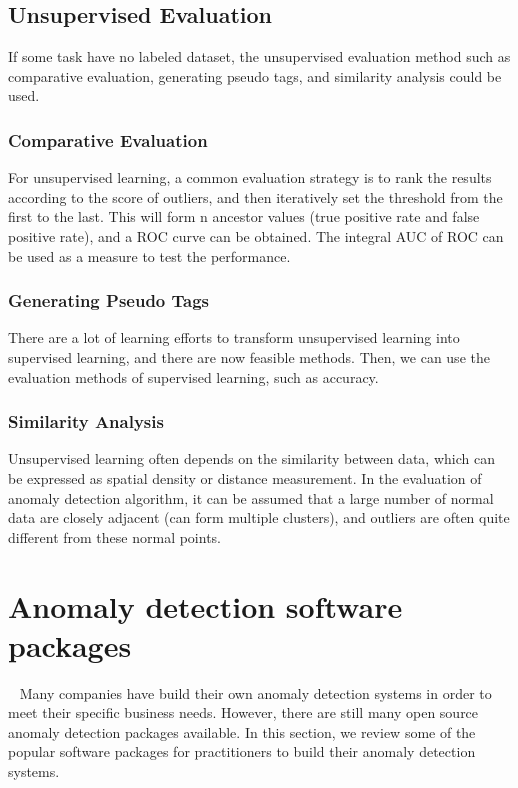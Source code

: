 \subsection{Unsupervised Evaluation}
If some task have no labeled dataset,
the unsupervised evaluation method
such as comparative evaluation,
generating pseudo tags,
and similarity analysis could be used.

\subsubsection{Comparative Evaluation}

For unsupervised learning,
a common evaluation strategy is to rank the
results according to the score of outliers,
and then iteratively set the threshold from
the first to the last.
This will form n ancestor values
(true positive rate and false positive rate),
and a ROC curve can be obtained.
The integral AUC of ROC can be used as a measure
to test the performance.


\subsubsection{Generating Pseudo Tags}

There are a lot of learning efforts to transform
unsupervised learning into supervised learning,
and there are now feasible methods.
Then,
we can use the evaluation methods of supervised learning,
such as accuracy.

\subsubsection{Similarity Analysis}

Unsupervised learning often depends
on the similarity between data,
which can be expressed as spatial density
or distance measurement.
In the evaluation of anomaly detection algorithm,
it can be assumed that a large number of normal
data are closely adjacent (can form multiple clusters),
and outliers are often quite different from these normal points.

\section{Anomaly detection software packages}~\label{sec:tools}
Many companies have build 
their own anomaly detection systems in order to 
meet their specific business needs. 
However,
there are still many open source anomaly detection packages available. 
In this section, 
we review some of the popular software packages for 
practitioners to build their anomaly detection systems.

